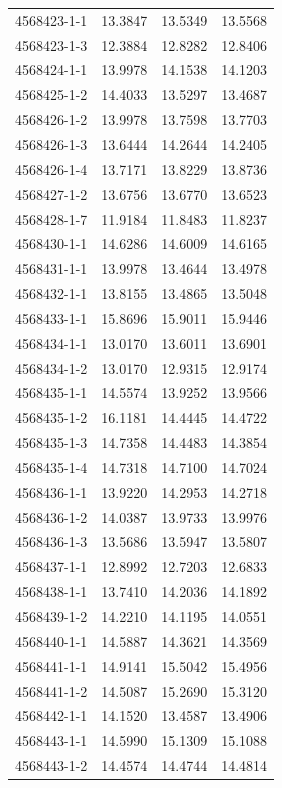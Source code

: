 \begin{longtable}{lrrr}
4568423-1-1 & 13.3847 & 13.5349 & 13.5568 \\
4568423-1-3 & 12.3884 & 12.8282 & 12.8406 \\
4568424-1-1 & 13.9978 & 14.1538 & 14.1203 \\
4568425-1-2 & 14.4033 & 13.5297 & 13.4687 \\
4568426-1-2 & 13.9978 & 13.7598 & 13.7703 \\
4568426-1-3 & 13.6444 & 14.2644 & 14.2405 \\
4568426-1-4 & 13.7171 & 13.8229 & 13.8736 \\
4568427-1-2 & 13.6756 & 13.6770 & 13.6523 \\
4568428-1-7 & 11.9184 & 11.8483 & 11.8237 \\
4568430-1-1 & 14.6286 & 14.6009 & 14.6165 \\
4568431-1-1 & 13.9978 & 13.4644 & 13.4978 \\
4568432-1-1 & 13.8155 & 13.4865 & 13.5048 \\
4568433-1-1 & 15.8696 & 15.9011 & 15.9446 \\
4568434-1-1 & 13.0170 & 13.6011 & 13.6901 \\
4568434-1-2 & 13.0170 & 12.9315 & 12.9174 \\
4568435-1-1 & 14.5574 & 13.9252 & 13.9566 \\
4568435-1-2 & 16.1181 & 14.4445 & 14.4722 \\
4568435-1-3 & 14.7358 & 14.4483 & 14.3854 \\
4568435-1-4 & 14.7318 & 14.7100 & 14.7024 \\
4568436-1-1 & 13.9220 & 14.2953 & 14.2718 \\
4568436-1-2 & 14.0387 & 13.9733 & 13.9976 \\
4568436-1-3 & 13.5686 & 13.5947 & 13.5807 \\
4568437-1-1 & 12.8992 & 12.7203 & 12.6833 \\
4568438-1-1 & 13.7410 & 14.2036 & 14.1892 \\
4568439-1-2 & 14.2210 & 14.1195 & 14.0551 \\
4568440-1-1 & 14.5887 & 14.3621 & 14.3569 \\
4568441-1-1 & 14.9141 & 15.5042 & 15.4956 \\
4568441-1-2 & 14.5087 & 15.2690 & 15.3120 \\
4568442-1-1 & 14.1520 & 13.4587 & 13.4906 \\
4568443-1-1 & 14.5990 & 15.1309 & 15.1088 \\
4568443-1-2 & 14.4574 & 14.4744 & 14.4814 \\

\end{longtable}
